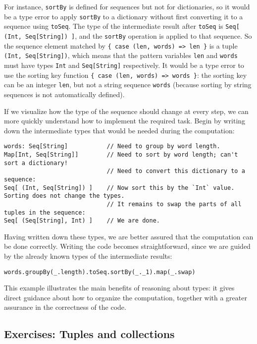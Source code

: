 For instance, \lstinline!sortBy! is defined for sequences but not
for dictionaries, so it would be a type error to
apply \lstinline!sortBy! to a dictionary without first converting
it to a sequence using \lstinline!toSeq!. The type of the intermediate
result after \lstinline!toSeq! is \lstinline!Seq[ (Int, Seq[String]) ]!,
and the \lstinline!sortBy! operation is applied to that sequence.
So the sequence element matched by \lstinline!{ case (len, words) => len }!
is a tuple \lstinline!(Int, Seq[String])!, which means that the pattern
variables \lstinline!len! and \lstinline!words! must have types
\lstinline!Int! and \lstinline!Seq[String]! respectively. It would
be a type error to use the sorting key function \lstinline!{ case (len, words) => words }!:
the sorting key can be an integer \lstinline!len!, but not a string
sequence \lstinline!words! (because sorting by string sequences is
not automatically defined).

If we visualize how the type of the sequence should change at every
step, we can more quickly understand how to implement the required
task. Begin by writing down the intermediate types that would be needed
during the computation:
\begin{lstlisting}
words: Seq[String]           // Need to group by word length.
Map[Int, Seq[String]]        // Need to sort by word length; can't sort a dictionary!
                             // Need to convert this dictionary to a sequence:
Seq[ (Int, Seq[String]) ]    // Now sort this by the `Int` value. Sorting does not change the types.
                             // It remains to swap the parts of all tuples in the sequence:
Seq[ (Seq[String], Int) ]    // We are done.
\end{lstlisting}
Having written down these types, we are better assured that the computation
can be done correctly. Writing the code becomes straightforward, since
we are guided by the already known types of the intermediate results:
\begin{lstlisting}
words.groupBy(_.length).toSeq.sortBy(_._1).map(_.swap)
\end{lstlisting}

This example illustrates the main benefits of reasoning about types:
it gives direct guidance about how to organize the computation, together
with a greater assurance in the correctness of the code.

\subsection{Exercises: Tuples and collections}

